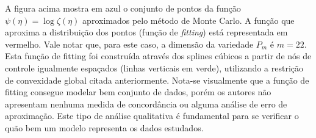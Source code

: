\documentclass[a4paper,titlepage]{article}
\begin{document}
\begin{center}
  \vspace{1em}
  \vspace{1em}
\end{center}

A figura acima mostra em azul o conjunto de pontos da função
$\psi(\eta) = \log \zeta(\eta)$ aproximados pelo método de Monte Carlo.
A função que aproxima a distribuição dos pontos (função de \textit{fitting})
está representada em vermelho. Vale notar que, para este caso, a dimensão da
variedade $P_m$ é $m=22$. Esta função de fitting foi construída através dos
splines cúbicos a partir de nós de controle igualmente espaçados (linhas
verticais em verde), utilizando a restrição de convexidade global citada
anteriormente. Nota-se visualmente que a função de fitting consegue modelar
bem conjunto de dados, porém os autores não apresentam nenhuma medida de
concordância ou alguma análise de erro de aproximação. Este tipo de análise
qualitativa é fundamental para se verificar o quão bem um modelo representa
os dados estudados.
\end{document}
